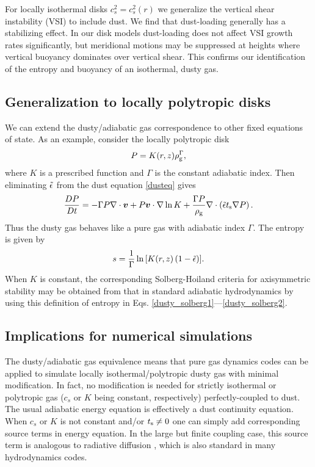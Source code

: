 
For locally isothermal disks $c^2_s=c_s^2(r)$ we generalize the vertical
shear instability (VSI) to include dust. We find that dust-loading
generally has a stabilizing effect. In our disk models
dust-loading does not affect VSI growth rates significantly, but
meridional motions may be suppressed at heights where vertical 
buoyancy dominates over vertical shear. This confirms our 
identification of the entropy and buoyancy of an isothermal, dusty
gas.  


\subsection{Generalization to locally polytropic disks}
We can extend the dusty/adiabatic gas correspondence to 
other fixed equations of state. As an example, consider the locally
polytropic disk 
\begin{align}
  P = K(r,z)\rho_\mathrm{g}^{\Gamma}, 
\end{align}
where $K$ is a prescribed function and $\Gamma$ is the constant
adiabatic index. Then eliminating $\tilde{\epsilon}$ from the dust equation
\ref{dusteq} gives 
\begin{align}
  \frac{D P}{D t} = - \Gamma P\nabla\cdot\bm{v}  + P \bm{v}\cdot\nabla \ln{K}
  + \frac{\Gamma P}{\rho_\mathrm{g}}\nabla\cdot\left(\tilde{\epsilon}t_\mathrm{s}\nabla
  P\right).
\end{align}
Thus the dusty gas behaves like a pure gas with adiabatic index
$\Gamma$. The entropy is given by 
\begin{align}
  s = \frac{1}{\Gamma}\ln{\left[K(r,z)\left(1 - \tilde{\epsilon}\right)\right]}.  
\end{align}
When $K$ is constant, the corresponding Solberg-Hoiland criteria for
axisymmetric stability may be obtained from that in standard adiabatic 
hydrodynamics \citep[e.g.][]{tassoul78} by
using this definition of entropy in
Eqs. \ref{dusty_solberg1}---\ref{dusty_solberg2}. 

\subsection{Implications for numerical simulations}
The dusty/adiabatic gas equivalence means that pure
gas dynamics codes can be applied to simulate locally
isothermal/polytropic dusty gas with minimal modification. In fact, no
modification is needed  
for strictly isothermal or polytropic gas ($c_s$ or $K$ being
constant, respectively) perfectly-coupled to dust. The usual 
adiabatic energy equation is effectively a dust continuity
equation. When $c_s$ or $K$ is not constant and/or $t_\mathrm{s}\neq0$ one
can simply add corresponding source terms in energy equation. In the
large but finite coupling case, this source term is analogous to
radiative diffusion \citep{price15}, which is also standard in many
hydrodynamics codes.      

